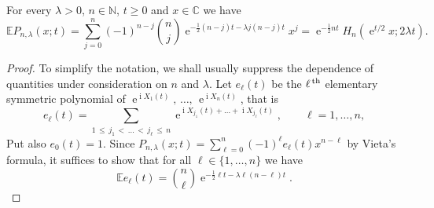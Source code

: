 \documentclass[AHL,Unicode,longabstracts,published]{cedram}
\DeclareMathOperator{\eee}{e}
\DeclareMathOperator{\ii}{i}
\newcommand{\E}{\mathbb{E}}
\newcommand{\N}{\mathbb{N}}
\newcommand{\C}{\mathbb{C}}
\begin{document}
\begin{theo}\label{theo:expected_char_poly_unitary_BM}
For every $\lambda>0$, $n\in \N$, $t\geq 0$ and $x\in \C$ we have
\[
\E P_{n,\lambda}(x;t) = \sum_{j = 0}^n(-1)^{n-j} \binom n j \eee^{ - \frac 12 (n-j) t - \lambda j (n-j) t} x^{j} =
\eee^{-\frac 12 nt} H_n\left(\eee^{t/2} x ; 2\lambda t\right).
\]
\end{theo}
\begin{proof}
To simplify the notation, we shall usually suppress the dependence of quantities under consideration on $n$ and $\lambda$. Let $e_\ell(t)$ be the $\ell^{\,\text{\normalfont th}}$ elementary symmetric polynomial of $\eee^{\ii X_1(t)},\,\ldots,\,\eee^{\ii X_n(t)}$, that is
\[
e_\ell(t) = \sum_{1\,\leq\,j_1\,<\,\ldots\,<\,j_\ell \,\leq\,n} \eee^{\ii X_{j_1}(t) +\ldots + \ii X_{j_\ell}(t)},
\qquad
\ell = 1,\ldots, n,
\]
Put also $e_0(t) = 1$. Since $P_{n,\lambda}(x;t) = \sum_{\ell = 0}^n (-1)^\ell e_\ell(t) x^{n-\ell}$ by Vieta's formula, it suffices to show that for all $\ell \in \{1,\ldots, n\}$ we have
\[
\E e_\ell(t) = \binom n\ell \eee^{-\frac 1 2 \ell t - \lambda \ell (n-\ell) t}.
\]



\end{proof}
\end{document}
